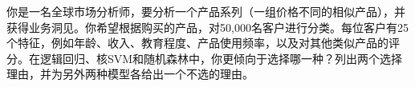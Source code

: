 你是一名全球市场分析师，要分析一个产品系列（一组价格不同的相似产品），并获得业务洞见。你希望根据购买的产品，对50,000名客户进行分类。每位客户有25个特征，例如年龄、收入、教育程度、产品使用频率，以及对其他类似产品的评分。在逻辑回归、核SVM和随机森林中，你更倾向于选择哪一种？列出两个选择理由，并为另外两种模型各给出一个不选的理由。
